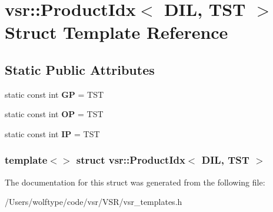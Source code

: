 \hypertarget{structvsr_1_1_product_idx_3_01_d_i_l_00_01_t_s_t_01_4}{\section{vsr\-:\-:Product\-Idx$<$ D\-I\-L, T\-S\-T $>$ Struct Template Reference}
\label{structvsr_1_1_product_idx_3_01_d_i_l_00_01_t_s_t_01_4}
}
\subsection*{Static Public Attributes}
\begin{DoxyCompactItemize}
\item 
\hypertarget{structvsr_1_1_product_idx_3_01_d_i_l_00_01_t_s_t_01_4_a77e892a2c4251c643f735eb58b3f1b9c}{static const int {\bfseries G\-P} = T\-S\-T}\label{structvsr_1_1_product_idx_3_01_d_i_l_00_01_t_s_t_01_4_a77e892a2c4251c643f735eb58b3f1b9c}

\item 
\hypertarget{structvsr_1_1_product_idx_3_01_d_i_l_00_01_t_s_t_01_4_a929de2e4f372d279c4cbe83edd190df4}{static const int {\bfseries O\-P} = T\-S\-T}\label{structvsr_1_1_product_idx_3_01_d_i_l_00_01_t_s_t_01_4_a929de2e4f372d279c4cbe83edd190df4}

\item 
\hypertarget{structvsr_1_1_product_idx_3_01_d_i_l_00_01_t_s_t_01_4_aa946093e3327c6461025a3105385ee7c}{static const int {\bfseries I\-P} = T\-S\-T}\label{structvsr_1_1_product_idx_3_01_d_i_l_00_01_t_s_t_01_4_aa946093e3327c6461025a3105385ee7c}

\end{DoxyCompactItemize}
\subsubsection*{template$<$$>$ struct vsr\-::\-Product\-Idx$<$ D\-I\-L, T\-S\-T $>$}



The documentation for this struct was generated from the following file\-:\begin{DoxyCompactItemize}
\item 
/\-Users/wolftype/code/vsr/\-V\-S\-R/vsr\-\_\-templates.\-h\end{DoxyCompactItemize}
